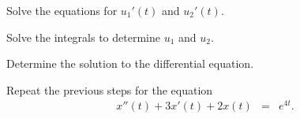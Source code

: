 \begin{problem}
\begin{subproblem}
    \vfill

  \item Solve the equations for $u_1'(t)$ and $u_2'(t)$.

    \vfill

    \clearpage

  \item Solve the integrals to determine $u_1$ and $u_2$.

    \vfill

  \item Determine the solution to the differential equation.

    \vfill


  \end{subproblem}

  \clearpage

\item Repeat the previous steps for the equation
  \begin{eqnarray*}
    x''(t) + 3x'(t) + 2x(t) & = & e^{4t}.
  \end{eqnarray*}


\end{problem}


